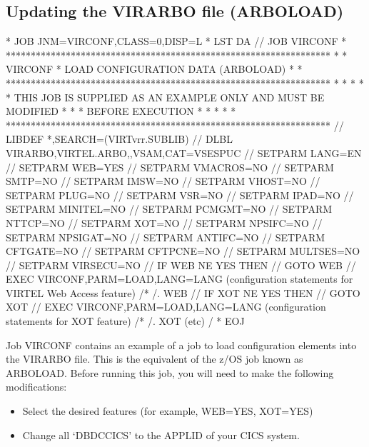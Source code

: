 \documentclass[letterpaper,10pt,english]{sphinxmanual}
\begin{document}
\subsection{Updating the VIRARBO file (ARBOLOAD)}
\label{\detokenize{Installation_Guide:updating-the-virarbo-file-arboload}}
\begin{sphinxVerbatim}[commandchars=\\\{\}]
* \PYGZdl{}\PYGZdl{} JOB JNM=VIRCONF,CLASS=0,DISP=L
* \PYGZdl{}\PYGZdl{} LST DA
// JOB VIRCONF
* *****************************************************************
* * VIRCONF * LOAD CONFIGURATION DATA (ARBOLOAD) *
* *****************************************************************
* * *
* * THIS JOB IS SUPPLIED AS AN EXAMPLE ONLY AND MUST BE MODIFIED *
* * BEFORE EXECUTION *
* * *
* *****************************************************************
// LIBDEF *,SEARCH=(VIRTvrr.SUBLIB)
// DLBL VIRARBO,\PYGZsq{}VIRTEL.ARBO\PYGZsq{},,VSAM,CAT=VSESPUC
// SETPARM LANG=EN
// SETPARM WEB=YES
// SETPARM VMACROS=NO
// SETPARM SMTP=NO
// SETPARM IMSW=NO
// SETPARM VHOST=NO
// SETPARM PLUG=NO
// SETPARM VSR=NO
// SETPARM IPAD=NO
// SETPARM MINITEL=NO
// SETPARM PCMGMT=NO
// SETPARM NTTCP=NO
// SETPARM XOT=NO
// SETPARM NPSIFC=NO
// SETPARM NPSIGAT=NO
// SETPARM ANTIFC=NO
// SETPARM CFTGATE=NO
// SETPARM CFTPCNE=NO
// SETPARM MULTSES=NO
// SETPARM VIRSECU=NO
// IF WEB NE YES THEN
// GOTO WEB
// EXEC VIRCONF,PARM=\PYGZsq{}LOAD,LANG=\PYGZam{}LANG\PYGZsq{}
  (configuration statements for VIRTEL Web Access feature)
/*
/. WEB
// IF XOT NE YES THEN
// GOTO XOT
// EXEC VIRCONF,PARM=\PYGZsq{}LOAD,LANG=\PYGZam{}LANG\PYGZsq{}
  (configuration statements for XOT feature)
/*
/. XOT
  (etc)
/\PYGZam{}
* \PYGZdl{}\PYGZdl{} EOJ
\end{sphinxVerbatim}


Job VIRCONF contains an example of a job to load configuration elements into the VIRARBO file. This is the equivalent of the z/OS job known as ARBOLOAD. Before running this job, you will need to make the following modifications:
\begin{itemize}
\item {} 
Select the desired features (for example, WEB=YES, XOT=YES)

\item {} 
Change all ‘DBDCCICS’ to the APPLID of your CICS system.

\end{itemize}
\end{document}
